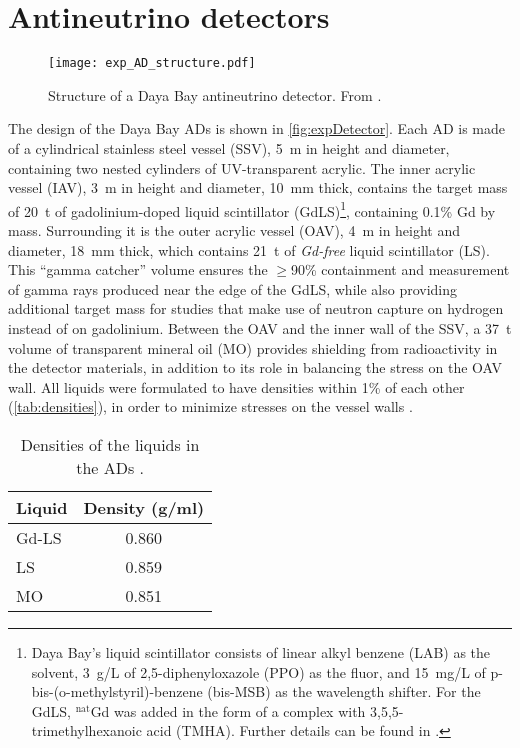\documentclass[../thesis.tex]{subfiles}
\begin{document}
\section{Antineutrino detectors}
\label{sec:expADs}

\begin{figure}[ht]
  \texttt{[image: exp\_AD\_structure.pdf]}
  \caption{Structure of a Daya Bay antineutrino detector. From \cite{An_2017}.}
  \label{fig:expDetector}
\end{figure}

The design of the Daya Bay ADs is shown in \autoref{fig:expDetector}. Each AD is made of a cylindrical stainless steel vessel (SSV), 5~m in height and diameter, containing two nested cylinders of UV-transparent acrylic. The inner acrylic vessel (IAV), 3~m in height and diameter, 10~mm thick, contains the target mass of 20~t of gadolinium-doped liquid scintillator (GdLS)\footnote{Daya Bay's liquid scintillator consists of linear alkyl benzene (LAB) as the solvent, 3~g/L of 2,5-diphenyloxazole (PPO) as the fluor, and 15~mg/L of p-bis-(o-methylstyril)-benzene (bis-MSB) as the wavelength shifter. For the GdLS, $^{\text{nat}}$Gd was added in the form of a complex with 3,5,5-trimethylhexanoic acid (TMHA). Further details can be found in \cite{Beriguete_2014}.}, containing 0.1\% Gd by mass. Surrounding it is the outer acrylic vessel (OAV), 4~m in height and diameter, 18~mm thick, which contains 21~t of \emph{Gd-free} liquid scintillator (LS). This ``gamma catcher'' volume ensures the $\ge$90\% containment and measurement of gamma rays produced near the edge of the GdLS, while also providing additional target mass for studies that make use of neutron capture on hydrogen instead of on gadolinium. Between the OAV and the inner wall of the SSV, a 37~t volume of transparent mineral oil (MO) provides shielding from radioactivity in the detector materials, in addition to its role in balancing the stress on the OAV wall. All liquids were formulated to have densities within 1\% of each other (\autoref{tab:densities}), in order to minimize stresses on the vessel walls \cite{AN2016133}.

\begin{table}[ht]
  \begin{tabular}{lc}
    \toprule
    Liquid & Density (g/ml) \\
    \midrule
    Gd-LS & 0.860 \\
    LS & 0.859 \\
    MO & 0.851 \\
    \bottomrule
  \end{tabular}
  \caption{Densities of the liquids in the ADs \cite{SideBySide}.}
  \label{tab:densities}
\end{table}
\end{document}
